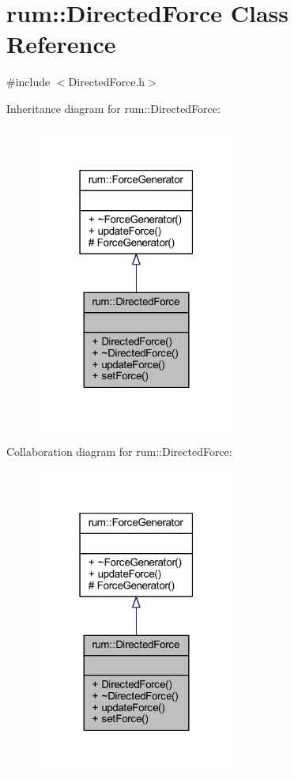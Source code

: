 \hypertarget{classrum_1_1_directed_force}{}\section{rum\+:\+:Directed\+Force Class Reference}
\label{classrum_1_1_directed_force}


{\ttfamily \#include $<$Directed\+Force.\+h$>$}



Inheritance diagram for rum\+:\+:Directed\+Force\+:\nopagebreak
\begin{figure}[H]
\begin{center}
\leavevmode
\includegraphics[width=187pt]{classrum_1_1_directed_force__inherit__graph}
\end{center}
\end{figure}


Collaboration diagram for rum\+:\+:Directed\+Force\+:\nopagebreak
\begin{figure}[H]
\begin{center}
\leavevmode
\includegraphics[width=187pt]{classrum_1_1_directed_force__coll__graph}
\end{center}
\end{figure}
